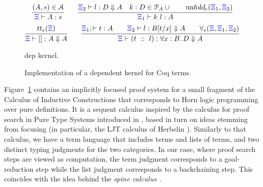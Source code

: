 \begin{footnotesize}
\begin{figure}[t]
  \renewcommand{\Gamma}{}
    \newcommand{\bc}[5]{#1#2\vdash #3 : #4 \Downarrow #5}
\[
\infer{\XXi\Gamma\vdash A : s}
{(A,s) \in \mathcal{A}
}
\qquad
\infer{\XXi_1\Gamma\vdash k\ l : A}
      {\bc{\XXi_2}{\Gamma} l D A \quad k : D \in \Pscr_A\cup\Gamma\qquad \unfoldExpert{\XXi_1}{\XXi_2}} 
\]
\vskip -18pt
\[
  \infer{\bc {\XXi}{\Gamma} {[]} A A}{\trueExpert{\XXi}}{}\qquad
  \infer{\bc{\XXi}{\Gamma}{(t\ ::\ l)} {\forall x:B.\, D} A}
  {\XXi_1;\Gamma\vdash t : A\qquad \bc{\XXi_2}{\Gamma}l {B[t/x]} A\qquad\prodExpert{\XXi}{\XXi_1}{\XXi_2}}{}
\]
%
\caption{dep kernel.}
\label{fig:augmented}
\end{figure}
\begin{figure}


\caption{Implementation of a  dependent kernel for Coq terms.}
\label{fig:kernel}
\end{figure}
\end{footnotesize}

Figure~\ref{fig:augmented} contains an implicitly focused proof system  for a small fragment of the Calculus of Inductive Constructions that corresponds to Horn logic programming over pure  definitions.
%
It is a sequent calculus inspired by the calculus for
proof search in Pure Type Systems introduced in \cite{LengrandDM06}, based in
 turn on ideas stemming from focusing (in particular, the LJT calculus of
Herbelin \cite{Herbelin94}). Similarly to that calculus, we have a term
language that includes terms and lists of terms, and two distinct typing
judgments for the two categories. In our case, where proof search steps are
viewed as computation, the term judgment corresponds to a goal-reduction
step while the list judgment corresponds to a backchaining step. This coincides
with the idea behind the \emph{spine calculus}~\cite{Cervesato97tr}.

